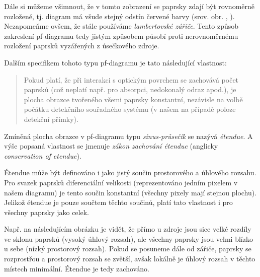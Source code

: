
Dále si můžeme všimnout, že v tomto zobrazení se paprsky zdají být rovnoměrně rozložené, tj. diagram má všude stejný odstín červené barvy (srov. obr. , ). Nezapomeňme ovšem, že stále používáme \emph{lambertovské zářiče}. Tento způsob zakreslení pf-diagramu tedy jistým způsobem působí proti nerovnoměrnému rozložení paprsků vyzářených z úsečkového zdroje.

Dalším specifikem tohoto typu pf-diagramu je tato následující vlastnost:

\begin{quote}
    Pokud platí, že při interakci s optickým povrchem se zachovává počet paprsků (což neplatí např. pro absorpci, nedokonalý odraz apod.), je plocha obrazce tvořeného všemi paprsky konstantní, nezávisle na volbě počátku detekčního souřadného systému (v našem na případě poloze detekční přímky).
\end{quote}

Zmíněná plocha obrazce v pf-diagramu typu \emph{sinus-průsečík} se nazývá \emph{étendue}. A výše popsaná vlastnost se jmenuje \emph{zákon zachování étendue} (anglicky \emph{conservation of etendue}).\src

Étendue může být definováno i jako jistý součin prostorového a úhlového rozsahu. Pro svazek paprsků diferenciální velikosti (reprezentováno jedním pixelem v našem diagramu) je tento součin konstantní (všechny pixely mají stejnou plochu). Jelikož étendue je pouze součtem těchto součinů, platí tato vlastnost i pro všechny paprsky jako celek.

Např. na následujícím obrázku je vidět, že přímo u zdroje jsou sice velké rozdíly ve sklonu paprsků (vysoký úhlový rozsah), ale všechny paprsky jsou velmi blízko u sebe (nízký prostorový rozsah). Pokud se posuneme dále od zářiče, paprsky se rozprostřou a prostorový rozsah se zvětší, avšak lokálně je úhlový rozsah v těchto místech minimální. Étendue je tedy zachováno.


